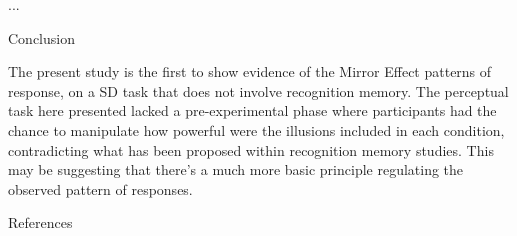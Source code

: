 \documentclass[final]{beamer}
\newlength{\onecolwid}
\begin{document}
\begin{frame}[t]
\begin{columns}[t]
\begin{column}{\onecolwid}
\begin{alertblock}{...}

\end{alertblock}



\begin{alertblock}{Conclusion}

The present study is the first to show evidence of the Mirror Effect patterns of response, on a SD task that does not involve recognition memory. The perceptual task here presented lacked a pre-experimental phase where participants had the chance to manipulate how powerful were the illusions included in each condition, contradicting what has been proposed within recognition memory studies. This may be suggesting that there’s a much more basic principle regulating the observed pattern of responses.

\end{alertblock}


\begin{alertblock}{References}
\nocite{*} %
\small{
\vspace{0.75in}}


\end{alertblock}
\end{column}
\end{columns}
\end{frame}
\end{document}
